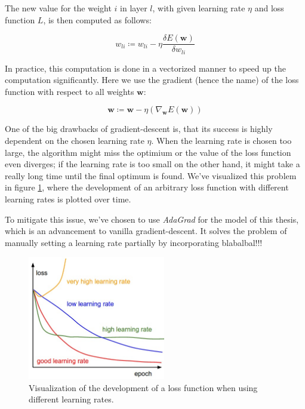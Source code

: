 The new value for the weight $i$ in layer $l$, with given learning rate $\eta$ and loss function $L$, is then computed as follows:

\begin{equation}
\label{fundamentals:equation:gradient_descent}
w_{li} \coloneqq w_{li} - \eta \frac{\delta E(\mathbf{w})}{\delta w_{li}}
\end{equation}

In practice, this computation is done in a vectorized manner to speed up the computation significantly. Here we use the gradient (hence the name) of the loss function with respect to all weights $\mathbf{w}$:

\begin{equation}
\mathbf{w} \coloneqq \mathbf{w} - \eta(\nabla_{\mathbf{w}}E(\mathbf{w}))
\end{equation}

One of the big drawbacks of gradient-descent is, that its success is highly dependent on the chosen learning rate $\eta$. When the learning rate is chosen too large, the algorithm might miss the optimium or the value of the loss function even diverges; if the learning rate is too small on the other hand, it might take a really long time until the final optimum is found. We've visualized this problem in figure \ref{fundamentals:figures:learning_rates}, where the development of an arbitrary loss function with different learning rates is plotted over time.

To mitigate this issue, we've chosen to use \emph{AdaGrad} \cite{Duchi:2011} for the model of this thesis, which is an advancement to vanilla gradient-descent. It solves the problem of manually setting a learning rate partially by incorporating blabalbal!!!

\begin{figure}[h]
	\centering
	\includegraphics[width=6cm]{img/learning_rates_comparison}
	\caption{Visualization of the development of a loss function when using different learning rates.\protect\footnotemark}
	\label{fundamentals:figures:learning_rates}
\end{figure}
